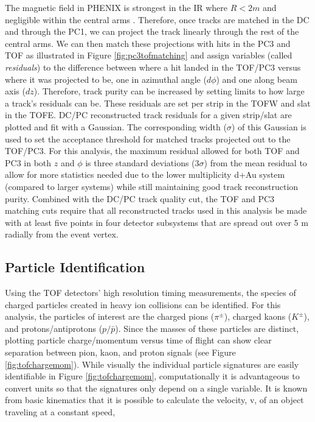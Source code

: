 The magnetic field in PHENIX is strongest in the IR where $R<2 m$ and negligible within the central arms \citep{rolnickthesis}. Therefore, once tracks are matched in the DC and through the PC1, we can project the track linearly through the rest of the central arms. We can then match these projections with hits in the PC3 and TOF as illustrated in Figure \ref{fig:pc3tofmatching} and assign variables (called \textit{residuals}) to the difference between where a hit landed in the TOF/PC3 versus where it was projected to be, one in azimuthal angle ($d\phi$) and one along beam axis ($dz$). Therefore, track purity can be increased by setting limits to how large a track's residuals can be. These residuals are set per strip in the TOFW and slat in the TOFE. DC/PC reconstructed track residuals for a given strip/slat are plotted and fit with a Gaussian. The corresponding width ($\sigma$) of this Gaussian is used to set the acceptance threshold for matched tracks projected out to the TOF/PC3. For this analysis, the maximum residual allowed for both TOF and PC3 in both $z$ and $\phi$ is three standard deviations ($3\sigma$) from the mean residual to allow for more statistics needed due to the lower multiplicity d+Au system (compared to larger systems) while still maintaining good track reconstruction purity. Combined with the DC/PC track quality cut, the TOF and PC3 matching cuts require that all reconstructed tracks used in this analysis be made with at least five points in four detector subsystems that are spread out over 5 m radially from the event vertex.

\subsection{Particle Identification}
\label{sect:pidmethod}
Using the TOF detectors' high resolution timing measurements, the species of charged particles created in heavy ion collisions can be identified. For this analysis, the particles of interest are the charged pions ($\pi^{\pm}$), charged kaons ($K^{\pm}$), and protons/antiprotons ($p/\bar{p}$). Since the masses of these particles are distinct, plotting particle charge/momentum versus time of flight can show clear separation between pion, kaon, and proton signals (see Figure \ref{fig:tofchargemom}). While visually the individual particle signatures are easily identifiable in Figure \ref{fig:tofchargemom}, computationally it is advantageous to convert units so that the signatures only depend on a single variable. It is known from basic kinematics that it is possible to calculate the velocity, v, of an object traveling at a constant speed,

